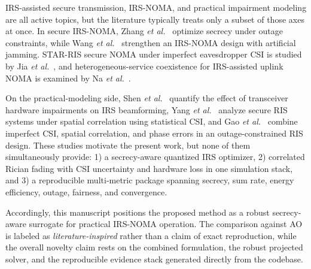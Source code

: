 IRS-assisted secure transmission, IRS-NOMA, and practical impairment modeling are all active topics, but the literature typically treats only a subset of those axes at once. In secure IRS-NOMA, Zhang \emph{et al.}~\cite{zhang2022tcom} optimize secrecy under outage constraints, while Wang \emph{et al.}~\cite{wang2022twc} strengthen an IRS-NOMA design with artificial jamming. STAR-RIS secure NOMA under imperfect eavesdropper CSI is studied by Jia \emph{et al.}~\cite{jia2023cl}, and heterogeneous-service coexistence for IRS-assisted uplink NOMA is examined by Na \emph{et al.}~\cite{na2024tvt}.

On the practical-modeling side, Shen \emph{et al.}~\cite{shen2021tcom} quantify the effect of transceiver hardware impairments on IRS beamforming, Yang \emph{et al.}~\cite{yang2023cl} analyze secure RIS systems under spatial correlation using statistical CSI, and Gao \emph{et al.}~\cite{gao2025tgcn} combine imperfect CSI, spatial correlation, and phase errors in an outage-constrained RIS design. These studies motivate the present work, but none of them simultaneously provide: 1) a secrecy-aware quantized IRS optimizer, 2) correlated Rician fading with CSI uncertainty and hardware loss in one simulation stack, and 3) a reproducible multi-metric package spanning secrecy, sum rate, energy efficiency, outage, fairness, and convergence.

Accordingly, this manuscript positions the proposed method as a robust secrecy-aware surrogate for practical IRS-NOMA operation. The comparison against AO is labeled as \emph{literature-inspired} rather than a claim of exact reproduction, while the overall novelty claim rests on the combined formulation, the robust projected solver, and the reproducible evidence stack generated directly from the codebase.
